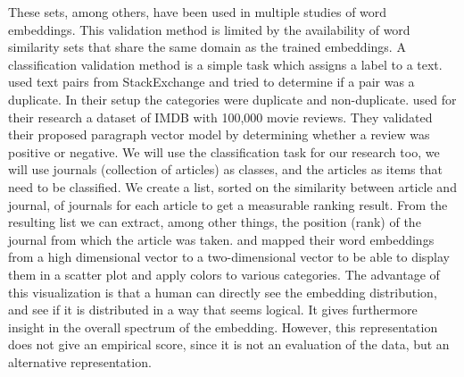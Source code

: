 \documentclass[../../Thesis.tex]{subfiles}
\begin{document}
\begin{jumpin}
These sets, among others, have been used in multiple studies of word embeddings\cite{pennington2014glove, mikolov2013efficient}. This validation method is limited by the availability of word similarity sets that share the same domain as the trained embeddings.
A classification validation method is a simple task which assigns a label to a text. \citet{lau2016empirical} used text pairs from StackExchange and tried to determine if a pair was a duplicate. In their setup the categories were duplicate and non-duplicate. \citet{le2014distributed} used for their research a dataset of IMDB with 100,000 movie reviews. They validated their proposed paragraph vector model by determining whether a review was positive or negative. We will use the classification task for our research too, we will use journals (collection of articles) as classes, and the articles as items that need to be classified. We create a list, sorted on the similarity between article and journal, of journals for each article to get a measurable ranking result. From the resulting list we can extract, among other things, the position (rank) of the journal from which the article was taken.
\citet{dai2015document} and \citet{hinton2003stochastic} mapped their word embeddings from a high dimensional vector to a two-dimensional vector to be able to display them in a scatter plot and apply colors to various categories. The advantage of this visualization is that a human can directly see the embedding distribution, and see if it is distributed in a way that seems logical. It gives furthermore insight in the overall spectrum of the embedding. However, this representation does not give an empirical score, since it is not an evaluation of the data, but an alternative representation. 
\end{jumpin}
\clearpage
{}
\end{document}
